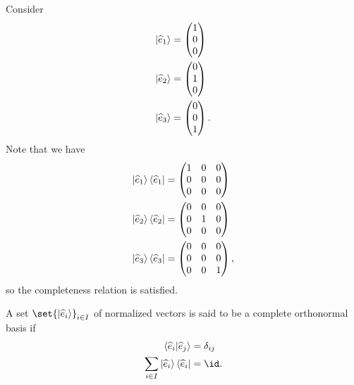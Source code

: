 \documentclass[10pt]{mypackage}
\begin{document}
\begin{example}
  Consider
  \begin{align*}
    \ket{\widehat{e}_1} &= \begin{pmatrix}1\\0\\0\end{pmatrix}\\
    \ket{\widehat{e}_2} &= \begin{pmatrix}0\\1\\0\end{pmatrix}\\
    \ket{\widehat{e}_3} &= \begin{pmatrix}0\\0\\1\end{pmatrix}.
  \end{align*}
  Note that we have
  \begin{align*}
    \ket{\widehat{e}_1}\bra{\widehat{e}_1} &= \begin{pmatrix}1 & 0 & 0 \\ 0 & 0 & 0 \\ 0 & 0 & 0\end{pmatrix}\\
    \ket{\widehat{e}_2}\bra{\widehat{e}_2} &= \begin{pmatrix}0 & 0 & 0 \\ 0 & 1 & 0 \\ 0 & 0 & 0\end{pmatrix}\\
    \ket{\widehat{e}_3}\bra{\widehat{e}_3} &= \begin{pmatrix}0 & 0 & 0 \\ 0 & 0 & 0 \\ 0 & 0 & 1\end{pmatrix},
  \end{align*}
  so the completeness relation is satisfied.
\end{example}
\begin{definition}
  A set $\set{\ket{\widehat{e}_{i}}}_{i\in I}$ of normalized vectors is said to be a complete orthonormal basis if
  \begin{align*}
    \braket{\widehat{e}_i}{\widehat{e}_j} &= \delta_{ij}\\
    \sum_{i\in I}\ket{\widehat{e}_i}\bra{\widehat{e}_i} &= \id.
  \end{align*}
\end{definition}
\end{document}
